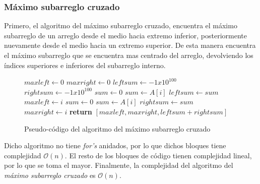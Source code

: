 \documentclass[12pt,twoside]{article}
\begin{document}
\subsubsection{M\'aximo subarreglo cruzado}
Primero, el algoritmo del m\'aximo subarreglo cruzado, encuentra el m\'aximo subarreglo de un arreglo desde el medio hacia extremo inferior, posteriormente nuevamente desde el medio hacia un extremo superior. De esta manera encuentra el m\'aximo subarreglo que se encuentra mas centrado del arreglo, devolviendo los \'indices superiores e inferiores del subarreglo interno.
\begin{figure}[ht]
    \centering
    \begin{algorithmic}[1]
            \State $maxleft \longleftarrow 0$
            \State $maxright \longleftarrow 0$
            \State $leftsum \longleftarrow -1x10^100$
            \State $rightsum \longleftarrow -1x10^100$
            \State $sum \longleftarrow 0$
                \State $sum \longleftarrow A[i]$
                    \State $leftsum \longleftarrow sum$
                    \State $maxleft \longleftarrow i$
                \EndIf
            \EndFor
            \State $sum \longleftarrow 0$
                \State $sum \longleftarrow A[i]$
                    \State $rightsum \longleftarrow sum$
                    \State $maxright \longleftarrow i$
                \EndIf
            \EndFor
            \State \textbf{return} $[maxleft, maxright, leftsum+rightsum]$
        \EndProcedure
    \end{algorithmic}
    \caption{Pseudo-c\'odigo del algoritmo del m\'aximo subarreglo cruzado}
    \label{fig:cross}
\end{figure}
Dicho algoritmo no tiene \textit{for's} anidados, por lo que dichos bloques tiene complejidad $\mathcal{O}(n)$. El resto de los bloques de c\'odigo tienen complejidad lineal, por lo que se toma el mayor. Finalmente, la complejidad del algoritmo del \textit{m\'aximo subarreglo cruzado} es $\mathcal{O}(n)$.
\end{document}
